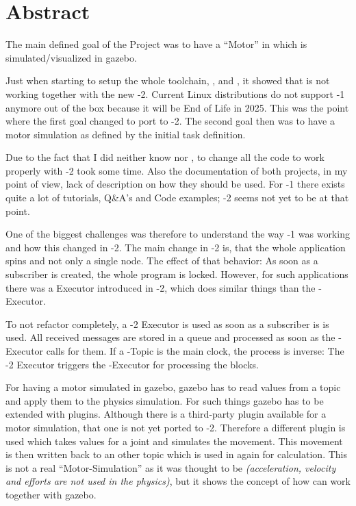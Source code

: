 
\section*{Abstract} \label{sec:abstract}

The main defined goal of the Project was to have a ``Motor'' in  which is simulated/visualized in \Gls{gazebo}.

Just when starting to setup the whole toolchain, ,  and , it showed that  is not working together with the new -2.
Current Linux distributions do not support -1 anymore out of the box because it will be End of Life in 2025.
This was the point where the first goal changed to port  to -2.
The second goal then was to have a motor simulation as defined by the initial task definition.

Due to the fact that I did neither know  nor , to change all the code to work properly with -2 took some time.
Also the documentation of both projects, in my point of view, lack of description on how they should be used.
For -1 there exists quite a lot of tutorials, Q\&A's and Code examples; -2 seems not yet to be at that point.

One of the biggest challenges was therefore to understand the way -1 was working and how this changed in -2.
The main change in -2 is, that the whole application spins and not only a single node.
The effect of that behavior: As soon as a subscriber is created, the whole  program is locked.
However, for such applications there was a Executor introduced in -2, which does similar things than the -Executor.

To not refactor  completely, a -2 Executor is used as soon as a subscriber is is used.
All received messages are stored in a queue and processed as soon as the -Executor calls for them.
If a -Topic is the main clock, the process is inverse: The -2 Executor triggers the -Executor for processing the blocks.

For having a motor simulated in \Gls{gazebo}, \Gls{gazebo} has to read values from a topic and apply them to the physics simulation.
For such things \Gls{gazebo} has to be extended with plugins.
Although there is a third-party plugin available for a motor simulation, that one is not yet ported to -2.
Therefore a different plugin is used which takes values for a joint and simulates the movement.
This movement is then written back to an other topic which is used in  again for calculation.
This is not a real ``Motor-Simulation'' as it was thought to be \textit{(acceleration, velocity and efforts are not used in the physics)}, but it shows the concept of how  can work together with \Gls{gazebo}.
